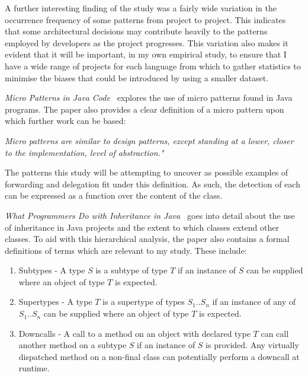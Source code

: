 A further interesting finding of the study was a fairly wide variation in the occurrence frequency of some patterns from project to project. This indicates that some architectural decisions may contribute heavily to the patterns employed by developers as the project progresses. This variation also makes it evident that it will be important, in my own empirical study, to ensure that I have a wide range of projects for each language from which to gather statistics to minimise the biases that could be introduced by using a smaller dataset.
\newline

\textit{Micro Patterns in Java Code~\cite{JavaMicropatterns}} explores the use of micro patterns found in Java programs. The paper also provides a clear definition of a micro pattern upon which further work can be based:
\begin{displayquote}\textit{
	Micro patterns are similar to design patterns, except standing at a lower, closer to the implementation, level of abstraction."~\cite{JavaMicropatterns}
}\end{displayquote}
The patterns this study will be attempting to uncover as possible examples of forwarding and delegation fit under this definition. As such, the detection of each can be expressed as a function over the content of the class.
\newline

\textit{What Programmers Do with Inheritance in Java~\cite{InheritanceInJava}} goes into detail about the use of inheritance in Java projects and the extent to which classes extend other classes. To aid with this hierarchical analysis, the paper also contains a formal definitions of terms which are relevant to my study. These include:
\begin{enumerate}
	\item Subtypes - A type $S$ is a subtype of type $T$ if an instance of $S$ can be supplied where an object of type $T$ is expected.
	\item Supertypes - A type $T$ is a supertype of types $S_1..S_n$ if an instance of any of $S_1..S_n$ can be supplied where an object of type $T$ is expected.
	\item Downcalls - A call to a method on an object with declared type $T$ can call another method on a subtype $S$ if an instance of $S$ is provided. Any virtually dispatched method on a non-final class can potentially perform a downcall at runtime.
\end{enumerate}

